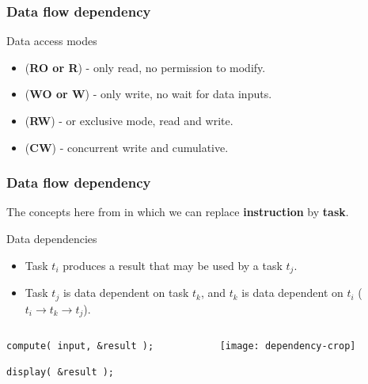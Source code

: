 \begin{frame}
  \frametitle{Data flow dependency}
  \begin{exampleblock}{Data access modes}
    \begin{itemize}[<+->]
    \item {}  ({\bf RO or R}) - only read, no permission to modify.
    \item {}  ({\bf WO or W}) - only write, no wait for data inputs.
    \item {} ({\bf RW}) - or exclusive mode, read and write.
    \item {} ({\bf CW}) - concurrent write and cumulative.
    \end{itemize}
  \end{exampleblock}
\end{frame}
\begin{frame}[fragile]
  \frametitle{Data flow dependency}
  The concepts here  from  in which
  we can replace {\bf instruction} by {\bf task}.
  \begin{block}{Data dependencies}
    \begin{itemize}
    \item Task $t_i$ produces a result that may be used by a task $t_j$.
    \item Task $t_j$ is data dependent on task $t_k$, and $t_k$ is 
    data dependent on $t_i$ ($t_i \rightarrow t_k \rightarrow t_j$). 
    \end{itemize}
  \end{block}
  \vspace*{-4mm}
  \begin{columns}
  \begin{column}{0.6\textwidth}
  \begin{flushright}
  \begin{block}{}
\begin{lstlisting}
compute( input, &result );

display( &result );
\end{lstlisting}
  \end{block}
  \end{flushright}
  \end{column}
    \begin{column}{0.4\textwidth}
      \begin{flushleft}
	\texttt{[image: dependency-crop]}
      \end{flushleft}
    \end{column}
  \end{columns}
\end{frame}
